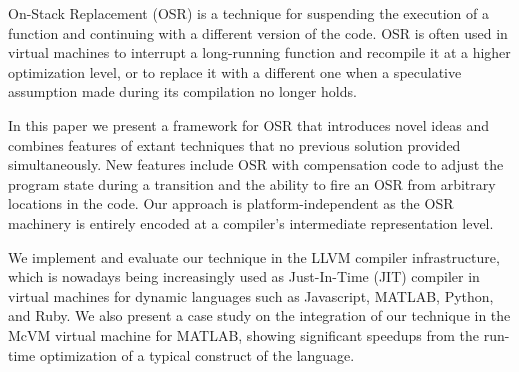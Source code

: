 
On-Stack Replacement (OSR) is a technique for suspending the execution of a function and continuing with a different version of the code. OSR is often used in virtual machines to interrupt a long-running function and recompile it at a higher optimization level, or to replace it with a different one when a speculative assumption made during its compilation no longer holds.

In this paper we present a framework for OSR that introduces novel ideas and combines features of extant techniques that no previous solution provided simultaneously. New features include OSR with compensation code to adjust the program state during a transition and the ability to fire an OSR from arbitrary locations in the code. Our approach is platform-independent as the OSR machinery is entirely encoded at a compiler's intermediate representation level.



We implement and evaluate our technique in the LLVM compiler infrastructure, which is nowadays being increasingly used as Just-In-Time (JIT) compiler in virtual machines for dynamic languages such as Javascript, MATLAB, Python, and Ruby. We also present a case study on the integration of our technique in the McVM virtual machine for MATLAB, showing significant speedups from the run-time optimization of a typical construct of the language.
  
  
  
  
  
  
  
  
  